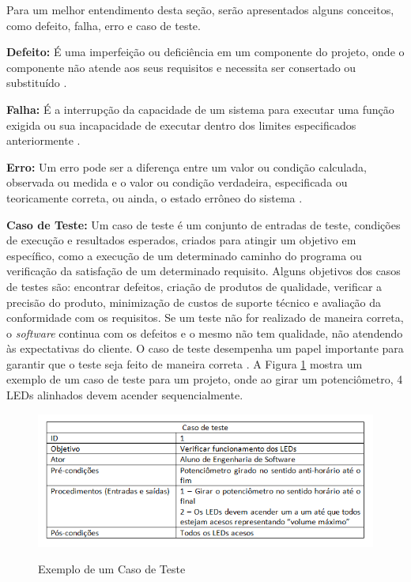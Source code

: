 Para um melhor entendimento desta seção, serão apresentados alguns conceitos, como defeito, falha, erro e caso de teste.

\textbf{Defeito:} É uma imperfeição ou deficiência em um componente do projeto, onde o componente não atende aos seus requisitos e necessita ser consertado ou substituído \cite{IEEE2017}.

\textbf{Falha:} É a interrupção da capacidade de um sistema para executar uma função exigida ou sua incapacidade de executar dentro dos limites especificados anteriormente \cite{IEEE2017}.

\textbf{Erro:} Um erro pode ser a diferença entre um valor ou condição calculada, observada ou medida e o valor ou condição verdadeira, especificada ou teoricamente correta, ou ainda, o estado errôneo do sistema \cite{IEEE2017}. 

\textbf{Caso de Teste:} Um caso de teste é um conjunto de entradas de teste, condições de execução e resultados esperados, criados para atingir um objetivo em específico, como a execução de um determinado caminho do programa ou verificação da satisfação de um determinado requisito. Alguns objetivos dos casos de testes são: encontrar defeitos, criação de produtos de qualidade, verificar a precisão do produto, minimização de custos de suporte técnico e avaliação da conformidade com os requisitos. Se um teste não for realizado de maneira correta, o \textit{software} continua com os defeitos e o mesmo não tem qualidade, não atendendo às expectativas do cliente. O caso de teste desempenha um papel importante para garantir que o teste seja feito de maneira correta \cite{ieeeTestCase2014}. A Figura \ref{fig:figura-exemplo-caso-de-teste} mostra um exemplo de um caso de teste para um projeto, onde ao girar um potenciômetro, 4 LEDs alinhados devem acender sequencialmente.

\begin{figure}[!htb]
    \centering
    \caption{Exemplo de um Caso de Teste}
    \includegraphics[width=1\textwidth]{./dados/figuras/casoDeTeste}
    \label{fig:figura-exemplo-caso-de-teste}
\end{figure}

